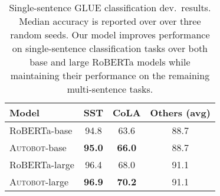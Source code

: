 
\begin{table}[t]
\centering
\footnotesize
\renewcommand{\arraystretch}{1.3}
\begin{tabular}{l | c | c | c}
\toprule
\textbf{Model} & \bf SST & \bf CoLA & \bf Others (avg) \\
\midrule 
RoBERTa-base & 94.8 & 63.6 & 88.7 \\
\textsc{Autobot}-base & \textbf{95.0} & \textbf{66.0} & 88.7 \\
\midrule 
RoBERTa-large & 96.4 & 68.0 & 91.1 \\
\textsc{Autobot}-large & \textbf{96.9} & \textbf{70.2} & 91.1 \\
\bottomrule
\end{tabular} %
\caption{%
Single-sentence GLUE classification dev.~results. Median accuracy is reported over over three random seeds. Our model improves performance on single-sentence classification tasks over both base and large RoBERTa models while maintaining their performance on the remaining multi-sentence tasks. %
}


\label{tab:glue}
\end{table}

